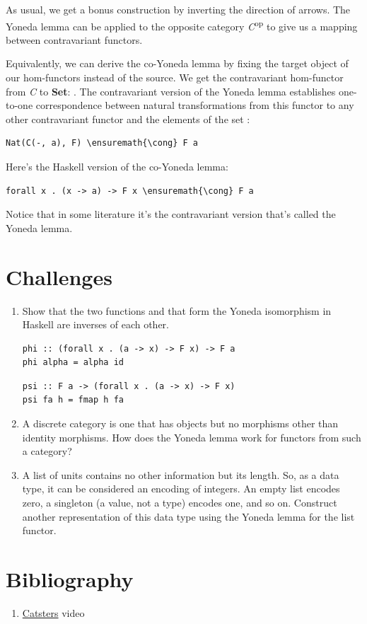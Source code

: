 As usual, we get a bonus construction by inverting the direction of
arrows. The Yoneda lemma can be applied to the opposite category
\emph{C}\textsuperscript{op} to give us a mapping between contravariant
functors.

Equivalently, we can derive the co-Yoneda lemma by fixing the target
object of our hom-functors instead of the source. We get the
contravariant hom-functor from \emph{C} to \textbf{Set}:
. The contravariant version of the Yoneda lemma
establishes one-to-one correspondence between natural transformations
from this functor to any other contravariant functor  and the
elements of the set :

\begin{Verbatim}[commandchars=\\\{\}]
Nat(C(-, a), F) \ensuremath{\cong} F a
\end{Verbatim}
Here's the Haskell version of the co-Yoneda lemma:

\begin{Verbatim}[commandchars=\\\{\}]
forall x . (x -> a) -> F x \ensuremath{\cong} F a
\end{Verbatim}
Notice that in some literature it's the contravariant version that's
called the Yoneda lemma.

\section{Challenges}\label{challenges}

\begin{enumerate}
\tightlist
\item
  Show that the two functions  and  that form
  the Yoneda isomorphism in Haskell are inverses of each other.

\begin{Verbatim}[commandchars=\\\{\}]
phi :: (forall x . (a -> x) -> F x) -> F a
phi alpha = alpha id
\end{Verbatim}
\begin{Verbatim}[commandchars=\\\{\}]
psi :: F a -> (forall x . (a -> x) -> F x)
psi fa h = fmap h fa
\end{Verbatim}
\item
  A discrete category is one that has objects but no morphisms other
  than identity morphisms. How does the Yoneda lemma work for functors
  from such a category?
\item
  A list of units \code{{[}(){]}} contains no other information but
  its length. So, as a data type, it can be considered an encoding of
  integers. An empty list encodes zero, a singleton \code{{[}(){]}} (a
  value, not a type) encodes one, and so on. Construct another
  representation of this data type using the Yoneda lemma for the list
  functor.
\end{enumerate}

\section{Bibliography}\label{bibliography}

\begin{enumerate}
\tightlist
\item
  \href{https://www.youtube.com/watch?v=TLMxHB19khE}{Catsters} video
\end{enumerate}